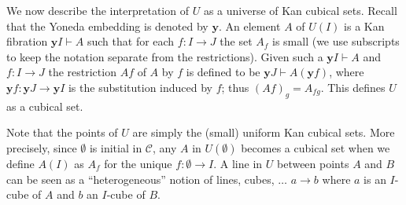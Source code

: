 \documentclass[10pt,a4paper]{article}
\newcommand{\CC}{{\mathcal C}}
\newcommand{\es}{\emptyset}
\newcommand{\rup}[1]{#1{\uparrow}}
\newcommand{\rdo}[1]{#1{\downarrow}}
\newcommand{\OO}{O}
\newcommand{\yoneda}{\mathbf{y}}
\begin{document}


We now describe the interpretation of $U$ as a universe of Kan cubical
sets. Recall that the Yoneda embedding is denoted by $\yoneda$.  An
element $A$ of $U(I)$ is a Kan fibration $\yoneda I \vdash A$ such
that for each $f \colon I \to J$ the set $A_f$ is small (we use
subscripts to keep the notation separate from the restrictions).
Given such a $\yoneda I \vdash A$ and $f \colon I \to J$ the
restriction $A f$ of $A$ by $f$ is defined to be $\yoneda J \vdash A
(\yoneda f)$, where $\yoneda f \colon \yoneda J \to \yoneda I$ is the
substitution induced by $f$; thus $(A f)_g = A_{f g}$.  This defines
$U$ as a cubical set.


Note that the points of $U$ are simply the (small) uniform Kan cubical
sets. More precisely, since $\es$ is initial in $\CC$,
any $A$ in $U(\es)$ becomes a cubical set when we define
$A(I)$ as $A_f$ for the unique $f:\es\to I$.
 A line in $U$ between points $A$ and $B$ can be seen as a
``heterogeneous'' notion of lines, cubes, $\dots$ $a\to b$
where $a$ is an $I$-cube of $A$ and $b$ an $I$-cube of $B$.
\end{document}
